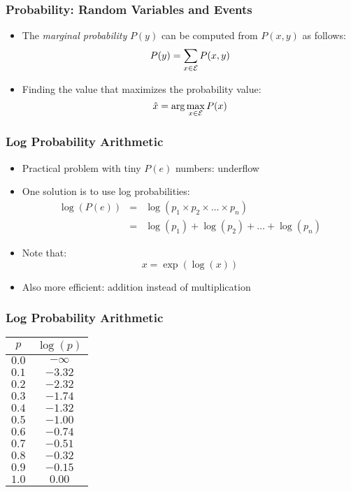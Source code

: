 \begin{frame}
\frametitle{Probability: Random Variables and Events}
\begin{itemize}[<+->]
\item The {\em marginal probability} $P(y)$ can be computed from $P(x,y)$ as
  follows:
\[ P(y) = \sum_{x \in {\cal E}} P(x,y) \]
\item Finding the value that maximizes the probability value:
\[ \hat{x} = \arg\max_{x \in {\cal E}} P(x) \]
\end{itemize}

\end{frame}

\begin{frame}
\frametitle{Log Probability Arithmetic}
\begin{itemize}[<+->]
\item Practical problem with tiny $P(e)$ numbers: underflow
\item One solution is to use log probabilities:
\begin{eqnarray}
\log(P(e)) &=& \log(p_1 \times p_2 \times \ldots \times p_n) \nonumber
\\
&=& \log(p_1) + \log(p_2) + \ldots + \log(p_n) \nonumber
\end{eqnarray}
\item Note that: \[ x = \exp(\log(x)) \]
\item Also more efficient: addition instead of multiplication
\end{itemize}

\end{frame}

\begin{frame}
\frametitle{Log Probability Arithmetic}
\begin{center}
\begin{tabular}{|c|c|}
\rowcolor{MidnightBlue!50}
$p$ & $\log(p)$ \\
\hline
$0.0$ & $- \infty$ \\
$0.1$ & $-3.32$ \\
$0.2$ & $-2.32$ \\
$0.3$ & $-1.74$ \\
$0.4$ & $-1.32$ \\
$0.5$ & $-1.00$ \\
$0.6$ & $-0.74$ \\
$0.7$ & $-0.51$ \\
$0.8$ & $-0.32$ \\
$0.9$ & $-0.15$ \\
$1.0$ & $0.00$ \\
\hline
\end{tabular}
\end{center}

\end{frame}

